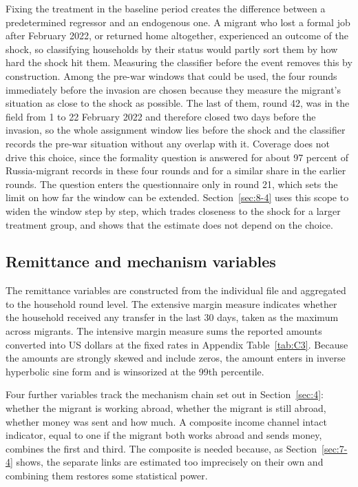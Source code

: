 Fixing the treatment in the baseline period creates the difference between a predetermined regressor and an endogenous one. A migrant who lost a formal job after February 2022, or returned home altogether, experienced an outcome of the shock, so classifying households by their status would partly sort them by how hard the shock hit them. Measuring the classifier before the event removes this by construction. Among the pre-war windows that could be used, the four rounds immediately before the invasion are chosen because they measure the migrant's situation as close to the shock as possible. The last of them, round 42, was in the field from 1 to 22 February 2022 and therefore closed two days before the invasion, so the whole assignment window lies before the shock and the classifier records the pre-war situation without any overlap with it. Coverage does not drive this choice, since the formality question is answered for about 97 percent of Russia-migrant records in these four rounds and for a similar share in the earlier rounds. The question enters the questionnaire only in round 21, which sets the limit on how far the window can be extended. Section~\ref{sec:8-4} uses this scope to widen the window step by step, which trades closeness to the shock for a larger treatment group, and shows that the estimate does not depend on the choice.

\subsection{Remittance and mechanism variables}\label{sec:5-4}

The remittance variables are constructed from the individual file and aggregated to the household round level. The extensive margin measure indicates whether the household received any transfer in the last 30 days, taken as the maximum across migrants. The intensive margin measure sums the reported amounts converted into US dollars at the fixed rates in Appendix Table~\ref{tab:C3}. Because the amounts are strongly skewed and include zeros, the amount enters in inverse hyperbolic sine form and is winsorized at the 99th percentile.

Four further variables track the mechanism chain set out in Section~\ref{sec:4}: whether the migrant is working abroad, whether the migrant is still abroad, whether money was sent and how much. A composite income channel intact indicator, equal to one if the migrant both works abroad and sends money, combines the first and third. The composite is needed because, as Section~\ref{sec:7-4} shows, the separate links are estimated too imprecisely on their own and combining them restores some statistical power.

